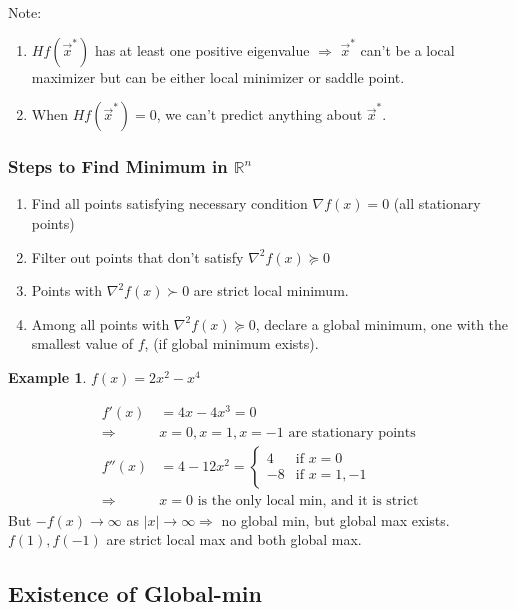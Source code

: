 \documentclass[11pt,a4paper]{article}
\newtheorem{example}{Example}
\begin{document}
    Note:
    \begin{enumerate}
        \item $Hf(\vec{x}^*)$ has at least one positive eigenvalue $\Rightarrow$ $\vec{x}^*$ can't be a local maximizer but can be either local minimizer or saddle point.
        \item When $Hf(\vec{x}^*)=0$, we can't predict anything about $\vec{x}^*$.
    \end{enumerate}





\subsubsection{Steps to Find Minimum in $\mathbb{R}^n$}
\begin{enumerate}
    \item Find all points satisfying necessary condition $\nabla f(x)=0$ (all stationary points)
    \item Filter out points that don't satisfy $\nabla^2 f(x)\succeq 0$
    \item Points with $\nabla^2 f(x)\succ 0$ are strict local minimum.
    \item Among all points with $\nabla^2 f(x)\succeq 0$, declare a global minimum, one with the smallest value of $f$, (if global minimum exists).
\end{enumerate}
\begin{example}
$f(x)=2x^2-x^4$
\end{example}
\begin{equation}
    \begin{aligned}
        f'(x)&=4x-4x^3=0\\
        \Rightarrow& x=0,x=1,x=-1\text{ are stationary points}\\
        f''(x)&=4-12x^2=\left\{\begin{matrix}
            4&\text{if }x=0\\
            -8&\text{if }x=1,-1
        \end{matrix}\right.\\
        \Rightarrow	&x=0\text{ is the only local min, and it is strict}
    \end{aligned}
    \nonumber
\end{equation}
But $-f(x) \rightarrow \infty$ as $|x|\rightarrow \infty \Rightarrow$ no global min, but global max exists. $f(1),f(-1)$ are strict local max and both global max.

\subsection{Existence of Global-min}
\end{document}
